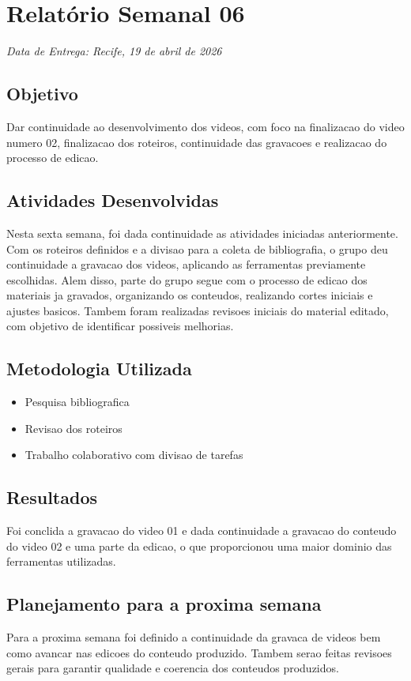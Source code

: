 \section{Relatório Semanal 06}
{\centering\noindent\textit{Data de Entrega: Recife, 19 de abril de 2026}\par}\bigskip

\subsection{Objetivo}
Dar continuidade ao desenvolvimento dos videos, com foco na finalizacao do video numero 02, finalizacao dos roteiros, continuidade das gravacoes e realizacao do processo de edicao.

\subsection{Atividades Desenvolvidas}
Nesta sexta semana, foi dada continuidade as atividades iniciadas anteriormente. Com os roteiros definidos e a divisao para a coleta de bibliografia, o grupo deu continuidade a gravacao dos videos, aplicando as ferramentas previamente escolhidas. Alem disso, parte do grupo segue com o processo de edicao dos materiais ja gravados, organizando os conteudos, realizando cortes iniciais e ajustes basicos. Tambem foram realizadas revisoes iniciais do material editado, com objetivo de identificar possiveis melhorias.

\subsection{Metodologia Utilizada}
\begin{itemize}
    \item Pesquisa bibliografica
    \item Revisao dos roteiros
    \item Trabalho colaborativo com divisao de tarefas
\end{itemize}

\subsection{Resultados}
Foi conclida a gravacao do video 01 e dada continuidade a gravacao do conteudo do video 02 e uma parte da edicao, o que proporcionou uma maior dominio das ferramentas utilizadas.

\subsection{Planejamento para a proxima semana}
Para a proxima semana foi definido a continuidade da gravaca de videos bem como avancar nas edicoes do conteudo produzido. Tambem serao feitas revisoes gerais para garantir qualidade e coerencia dos conteudos produzidos.

